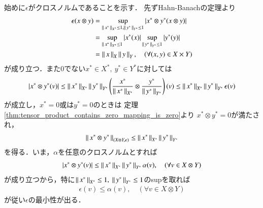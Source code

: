 	\begin{prf}
		始めに$\epsilon$がクロスノルムであることを示す．
		先ずHahn-Banachの定理より
		\begin{align}
			\epsilon(x \otimes y) 
			&= \operatorname*{sup}_{\left\|\, x^*\, \right\|_{X^*}\leq 1,\left\|\, y^*\, \right\|_{Y^*} \leq 1} \left| x^* \otimes y^* (x \otimes y) \right| \\
			&= \operatorname*{sup}_{\left\|\, x^*\, \right\|_{X^*} \leq 1} \left| x^*(x) \right|
			\operatorname*{sup}_{\left\|\, y^*\, \right\|_{Y^*} \leq 1} \left| y^*(y) \right| \\
			&= \left\|\, x\, \right\|_{X} \left\|\, y\, \right\|_{Y},
			\quad (\forall (x,y) \in X \times Y)
		\end{align}
		が成り立つ．また0でない$x^* \in X^*,\ y^* \in Y^*$に対しては
		\begin{align}
			\left| x^* \otimes y^* (v) \right|
			\leq \left\|\, x^*\, \right\|_{X^*} \left\|\, y^*\, \right\|_{Y^*} \left( \frac{x^*}{\left\|\, x^*\, \right\|_{X^*}} \otimes \frac{y^*}{\left\|\, y^*\, \right\|_{Y^*}} \right) (v)
			\leq \left\|\, x^*\, \right\|_{X^*} \left\|\, y^*\, \right\|_{Y^*} \epsilon(v)
		\end{align}
		が成立し，$x^*=0$或は$y^*=0$のときは
		定理\ref{thm:tensor_product_contains_zero_mapping_is_zero}より
		$x^* \otimes y^* = 0$が満たされ，
		\begin{align}
			\left\|\, x^* \otimes y^*\, \right\|_{(X \otimes Y,\epsilon)} \leq \left\|\, x^*\, \right\|_{X^*} \left\|\, y^*\, \right\|_{Y^*}
		\end{align}
		を得る．いま，$\alpha$を任意のクロスノルムとすれば
		\begin{align}
			\left| x^* \otimes y^* (v) \right| \leq \left\|\, x^*\, \right\|_{X^*} \left\|\, y^*\, \right\|_{Y^*} \alpha(v),
			\quad (\forall v \in X \otimes Y)
		\end{align}
		が成り立つから，特に$\left\|\, x^*\, \right\|_{X^*} \leq 1,\ \left\|\, y^*\, \right\|_{Y^*} \leq 1$のsupを取れば
		\begin{align}
			\epsilon(v) \leq \alpha(v),
			\quad (\forall v \in X \otimes Y)
		\end{align}
		が従い$\epsilon$の最小性が出る．
		\QED
	\end{prf}